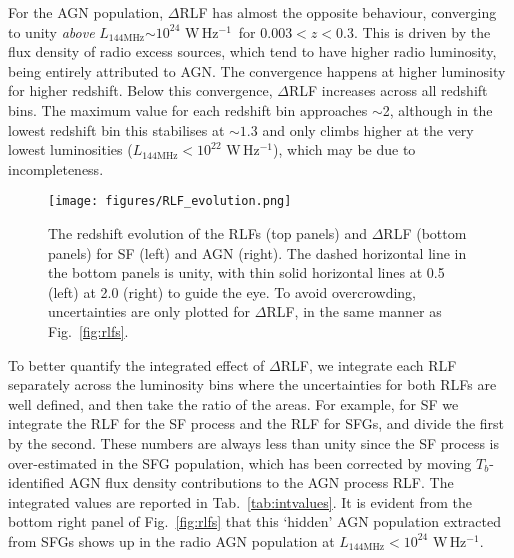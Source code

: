 \documentclass[usenatbib,fleqn,letters]{mnras}
\newcommand{\wphz}{$\,$W$\,$Hz$^{-1}$}
\newcommand{\llof}{$L_{\textrm{144MHz}}$}
\begin{document}
For the AGN population, $\Delta$RLF has almost the opposite behaviour, converging to unity \textit{above} \llof $\sim10^{24}\,$\wphz\ for $0.003 < z < 0.3$. This is driven by the flux density of radio excess sources, which tend to have higher radio luminosity, being entirely attributed to AGN. The convergence happens at higher luminosity for higher redshift. Below this convergence, $\Delta$RLF increases across all redshift bins. The maximum value for each redshift bin approaches $\sim$2, although in the lowest redshift bin this stabilises at $\sim1.3$ and only climbs higher at the very lowest luminosities (\llof $<10^{22}\,$\wphz ), which may be due to incompleteness. 

\begin{figure*}
    \centering
    \texttt{[image: figures/RLF\_evolution.png]}
    \caption{The redshift evolution of the RLFs (top panels) and $\Delta$RLF (bottom panels) for SF (left) and AGN (right). The dashed horizontal line in the bottom panels is unity, with thin solid horizontal lines at 0.5 (left) at 2.0 (right) to guide the eye. To avoid overcrowding, uncertainties are only plotted for $\Delta$RLF, in the same manner as Fig.~\ref{fig:rlfs}. }
    \label{fig:evolution}
\end{figure*}

To better quantify the integrated effect of $\Delta$RLF, we integrate each RLF separately across the luminosity bins where the uncertainties for both RLFs are well defined, and then take the ratio of the areas. For example, for SF we integrate the RLF for the SF process and the RLF for SFGs, and divide the first by the second. These numbers are always less than unity since the SF process is over-estimated in the SFG population, which has been corrected by moving $T_b$-identified AGN flux density contributions to the AGN process RLF. The integrated values are reported in Tab.~\ref{tab:intvalues}. 
It is evident from the bottom right panel of Fig.~\ref{fig:rlfs} that this `hidden' AGN population extracted from SFGs shows up in the radio AGN population at $L_{\textrm{144MHz}} < 10^{24}\,$\wphz .

\end{document}
